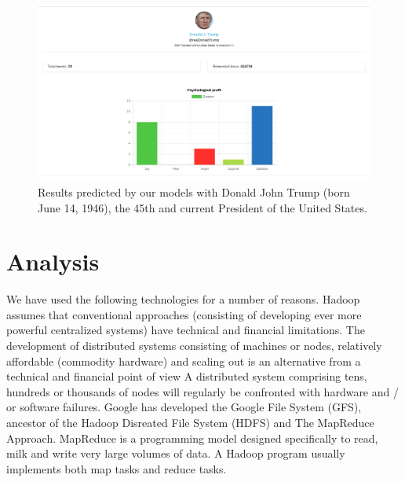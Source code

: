 \documentclass{acmtog} %
\begin{document}
\begin{figure}[t]
\centerline{\includegraphics[height=0.5\textwidth]{trump.png}}
\caption{Results predicted by our models with Donald John Trump (born June 14, 1946), the 45th and current President of the United States.}
  \label{fig:trump_results}
\end{figure}

\section{Analysis}
\label{sec:analysis}
We have used the following technologies for a number of reasons. Hadoop assumes that conventional approaches (consisting of developing ever more powerful centralized systems) have technical and financial limitations.
The development of distributed systems consisting of machines or nodes, relatively affordable (commodity hardware) and scaling out is an alternative from a technical and financial point of view
A distributed system comprising tens, hundreds or thousands of nodes will regularly be confronted with hardware and / or software failures.
Google has developed the Google File System (GFS), ancestor of the Hadoop Disreated File System (HDFS) and The MapReduce Approach.
MapReduce is a programming model designed specifically to read, milk and write very large volumes of data. A Hadoop program usually implements both map tasks and reduce tasks.
\end{document}
